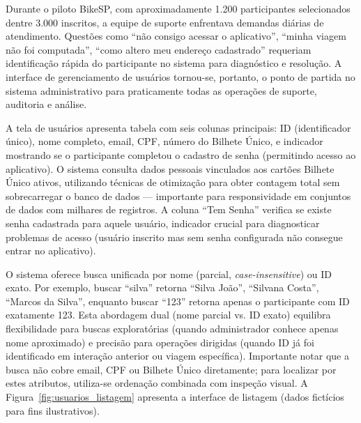 

Durante o piloto BikeSP, com
aproximadamente 1.200 participantes selecionados dentre 3.000 inscritos, a equipe de
suporte enfrentava demandas diárias de atendimento. Questões como ``não consigo acessar o aplicativo'', ``minha viagem não foi
computada'', ``como altero meu endereço cadastrado'' requeriam identificação rápida
do participante no sistema para diagnóstico e resolução. A interface de gerenciamento
de usuários tornou-se, portanto, o
ponto de partida no sistema administrativo  para praticamente todas as operações de suporte,
auditoria e análise.

A tela de usuários apresenta
tabela com seis colunas principais: ID (identificador único), nome
completo, email, CPF, número do Bilhete Único, e indicador mostrando se o participante
completou o cadastro de senha (permitindo acesso ao aplicativo). O sistema consulta dados pessoais vinculados aos cartões Bilhete Único ativos, utilizando técnicas de otimização para obter contagem total sem sobrecarregar o banco de dados --- importante para responsividade em conjuntos de dados com milhares de registros. A coluna ``Tem Senha'' verifica se existe senha cadastrada para aquele usuário, indicador crucial para diagnosticar
problemas de acesso (usuário inscrito mas sem senha configurada não consegue entrar no aplicativo).

O sistema oferece busca unificada por nome
(parcial, \textit{case-insensitive}\@) ou ID exato.
Por exemplo, buscar ``silva'' retorna ``Silva João'', ``Silvana Costa'', ``Marcos da
Silva'', enquanto buscar ``123'' retorna apenas o participante com ID exatamente 123.
Esta abordagem dual (nome parcial vs. ID exato) equilibra flexibilidade para buscas
exploratórias (quando administrador conhece apenas nome aproximado) e precisão para
operações dirigidas (quando ID já foi identificado em interação anterior ou viagem
específica). Importante notar que a busca não cobre email, CPF ou Bilhete
Único diretamente; para localizar por estes atributos, utiliza-se ordenação combinada com inspeção visual. A Figura~\ref{fig:usuarios_listagem} apresenta a interface de listagem (dados fictícios para fins ilustrativos).


